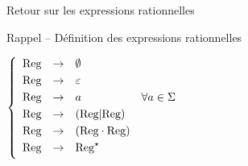 \begin{frame}{Retour sur les expressions rationnelles}
\begin{block}{Rappel -- Définition des expressions rationnelles}
\begin{minipage}{.5\textwidth}
      \vspace{2mm}
      $\left\{\begin{array}{llll}
      \vspace{1mm}\text{Reg} &\rightarrow& \emptyset \\
      \vspace{1mm}\text{Reg} &\rightarrow& \varepsilon \\
      \vspace{1mm}\text{Reg} &\rightarrow& a & \forall a\in \Sigma \\
      \vspace{1mm}\text{Reg} &\rightarrow& (\text{Reg} | \text{Reg}) \\
      \vspace{1mm}\text{Reg} &\rightarrow& (\text{Reg} \cdot \text{Reg}) \\
      \vspace{1mm}\text{Reg} &\rightarrow& \text{Reg}^\star \\
      \end{array}\right.$
    \end{minipage}%
  \end{block}

\end{frame}

\endgroup
